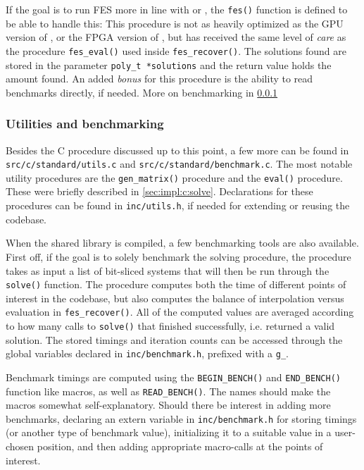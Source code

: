 If the goal is to run FES more in line with \cite{cryptoeprint:2013/436} or \cite{ches-2010-23990}, the \texttt{fes()} function is defined to be able to handle this:
This procedure is not as heavily optimized as the GPU version of \cite{ches-2010-23990}, or the FPGA version of \cite{cryptoeprint:2013/436}, but has received the same level of \textit{care} as the procedure \texttt{fes\_eval()} used inside \texttt{fes\_recover()}. The solutions found are stored in the parameter \texttt{poly\_t *solutions} and the return value holds the amount found. An added \textit{bonus} for this procedure is the ability to read benchmarks directly, if needed. More on benchmarking in \cref{sec:impl:c:util_bench}

\subsubsection{Utilities and benchmarking} \label{sec:impl:c:util_bench}
Besides the C procedure discussed up to this point, a few more can be found in \texttt{src/c/standard/utils.c} and \texttt{src/c/standard/benchmark.c}. The most notable utility procedures are the \texttt{gen\_matrix()} procedure and the \texttt{eval()} procedure. These were briefly described in \cref{sec:impl:c:solve}. Declarations for these procedures can be found in \texttt{inc/utils.h}, if needed for extending or reusing the codebase.

When the shared library is compiled, a few benchmarking tools are also available. First off, if the goal is to solely benchmark the solving procedure, the procedure 
takes as input a list of bit-sliced systems that will then be run through the \texttt{solve()} function. The procedure computes both the time of different points of interest in the codebase, but also computes the balance of interpolation versus evaluation in \texttt{fes\_recover()}. All of the computed values are averaged according to how many calls to \texttt{solve()} that finished successfully, i.e. returned a valid solution. The stored timings and iteration counts can be accessed through the global variables declared in \texttt{inc/benchmark.h}, prefixed with a \texttt{g\_}. 

Benchmark timings are computed using the \texttt{BEGIN\_BENCH()} and \texttt{END\_BENCH()} function like macros, as well as \texttt{READ\_BENCH()}. The names should make the macros somewhat self-explanatory. Should there be interest in adding more benchmarks, declaring an extern variable in \texttt{inc/benchmark.h} for storing timings (or another type of benchmark value), initializing it to a suitable value in a user-chosen position, and then adding appropriate macro-calls at the points of interest.

